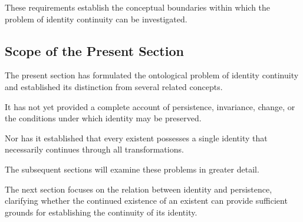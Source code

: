 These requirements establish the
conceptual boundaries within which
the problem of identity continuity
can be investigated.

\subsection{Scope of the Present Section}

The present section has formulated
the ontological problem of identity
continuity and established its
distinction from several related
concepts.

It has not yet provided a complete
account of persistence, invariance,
change, or the conditions under
which identity may be preserved.

Nor has it established that every
existent possesses a single identity
that necessarily continues through
all transformations.

The subsequent sections will examine
these problems in greater detail.

The next section focuses on the
relation between identity and
persistence, clarifying whether
the continued existence of an
existent can provide sufficient
grounds for establishing the
continuity of its identity.

